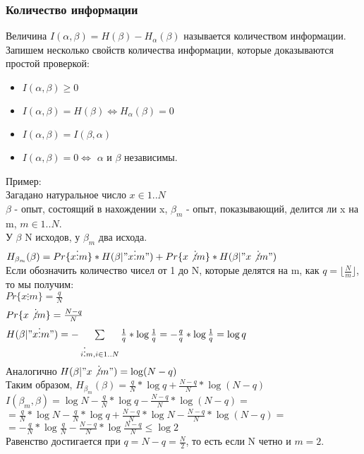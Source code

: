 \subsubsection{Количество информации}
Величина $I(\alpha, \beta) = H(\beta) - H_{\alpha}(\beta)$ называется количеством информации.\\
Запишем несколько свойств количества информации, которые доказываются простой проверкой:\\
\begin{itemize}
\item $I(\alpha, \beta) \geq 0$\\
\item $I(\alpha, \beta) = H(\beta) \Leftrightarrow H_{\alpha}(\beta) = 0$\\
\item $I(\alpha, \beta) = I(\beta, \alpha)$\\
\item $I(\alpha, \beta) = 0 \Leftrightarrow$ $\alpha$ и $\beta$ независимы.
\end{itemize}
Пример:\\
Загадано натуральное число $x \in 1..N$\\
$\beta$ - опыт, состоящий в нахождении x, $\beta_m$ - опыт, показывающий, делится ли x на m, $m \in 1..N$.\\
У $\beta$ N исходов, у $\beta_m$ два исхода.\\
$H_{\beta_m}(\beta) = Pr\{x \vdots m\} * H(\beta | "x \vdots m") + Pr\{x \not\vdots m\} * H(\beta | "x \not\vdots m")$\\
Если обозначить количество чисел от 1 до N, которые делятся на m, как $q = \lfloor \frac{N}{m} \rfloor$, то мы получим:\\
$Pr\{x \vdots m\} = \frac{q}{N}$\\
$Pr\{x \not\vdots m\} = \frac{N - q}{N}$\\
$H(\beta | "x \vdots m") = -\sum\limits_{i \vdots m, i \in 1..N} \frac{1}{q} * \log \frac{1}{q} = -\frac{q}{q} * \log \frac{1}{q} = \log q$\\
Аналогично $H(\beta | "x \not\vdots m") = \log (N - q)$\\
Таким образом, $H_{\beta_m}(\beta) = \frac{q}{N} * \log q + \frac{N - q}{N} * \log (N - q)$\\
$I(\beta_m, \beta) = \log N - \frac{q}{N} * \log q - \frac{N - q}{N} * \log (N - q) = $\\
$ = \frac{q}{N} * \log N - \frac{q}{N} * \log q + \frac{N - q}{N} * \log N - \frac{N - q}{N} * \log (N - q) = $\\
$ = -\frac{q}{N} * \log \frac{q}{N} - \frac{N - q}{N} * \log \frac{N - q}{N} \leq \log 2$\\
Равенство достигается при $q = N - q = \frac{N}{2}$, то есть если N четно и $m = 2$.